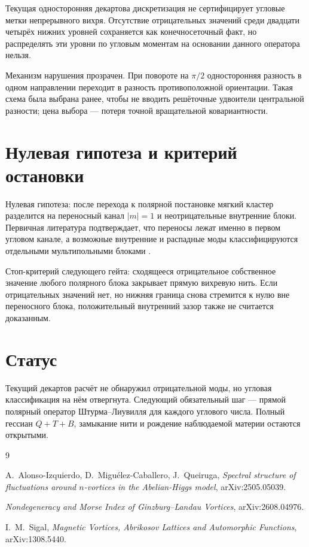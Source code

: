 \begin{proposition}
Текущая односторонняя декартова дискретизация не сертифицирует угловые метки
непрерывного вихря. Отсутствие отрицательных значений среди двадцати четырёх
нижних уровней сохраняется как конечносеточный факт, но распределять эти
уровни по угловым моментам на основании данного оператора нельзя.
\end{proposition}

Механизм нарушения прозрачен. При повороте на $\pi/2$ односторонняя разность
в одном направлении переходит в разность противоположной ориентации. Такая
схема была выбрана ранее, чтобы не вводить решёточные удвоители центральной
разности; цена выбора --- потеря точной вращательной ковариантности.

\section{Нулевая гипотеза и критерий остановки}

Нулевая гипотеза: после перехода к полярной постановке мягкий кластер
разделится на переносный канал $|m|=1$ и неотрицательные внутренние блоки.
Первичная литература подтверждает, что переносы лежат именно в первом
угловом канале, а возможные внутренние и распадные моды классифицируются
отдельными мультипольными блоками \cite{sigal-vortex-decomposition,
alonso-vortex-spectrum}.

Стоп-критерий следующего гейта: сходящееся отрицательное собственное значение
любого полярного блока закрывает прямую вихревую нить. Если отрицательных
значений нет, но нижняя граница снова стремится к нулю вне переносного блока,
положительный внутренний зазор также не считается доказанным.

\section{Статус}

Текущий декартов расчёт не обнаружил отрицательной моды, но угловая
классификация на нём отвергнута. Следующий обязательный шаг --- прямой
полярный оператор Штурма--Лиувилля для каждого углового числа. Полный гессиан
$Q+T+B$, замыкание нити и рождение наблюдаемой материи остаются открытыми.

\begin{thebibliography}{9}\raggedright
{}
A.~Alonso-Izquierdo, D.~Migu\'elez-Caballero, J.~Queiruga,
\emph{Spectral structure of fluctuations around $n$-vortices in the
Abelian-Higgs model}, arXiv:2505.05039.

\emph{Nondegeneracy and Morse Index of Ginzburg--Landau Vortices},
arXiv:2608.04976.

I.~M.~Sigal,
\emph{Magnetic Vortices, Abrikosov Lattices and Automorphic Functions},
arXiv:1308.5440.
\end{thebibliography}
